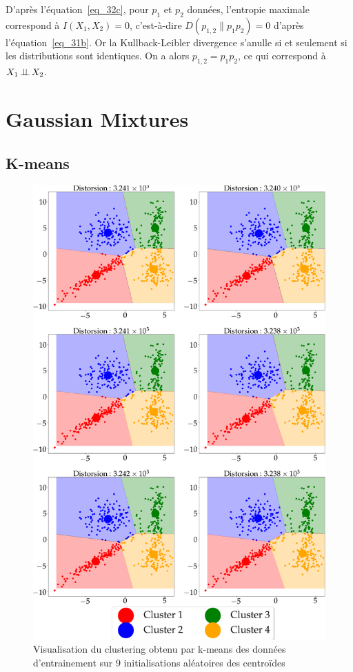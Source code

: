 \documentclass[12pt,a4paper,onecolumn]{article}
\begin{document}
D'après l'équation~\eqref{eq_32c}, pour \(p_1\) et \(p_2\) données, l'entropie maximale correspond à \(I(X_1, X_2) = 0\), c'est-à-dire \(D(p_{1, 2} \parallel p_1p_2) = 0\) d'après l'équation~\eqref{eq_31b}. Or la Kullback-Leibler divergence s'anulle si et seulement si les distributions sont identiques. On a alors \(p_{1,2} = p_1p_2\), ce qui correspond à \(X_1 \,\bot\!\!\!\bot\, X_2\).

\section{Gaussian Mixtures}

\subsection{K-means}

\begin{figure}[H]
	\centering
	\includegraphics[width = \textwidth]{4_a}
	\caption{Visualisation du clustering obtenu par k-means des données d'entrainement sur 9 initialisations aléatoires des centroïdes}
	\label{fig_4_K_means}
\end{figure}
\end{document}
